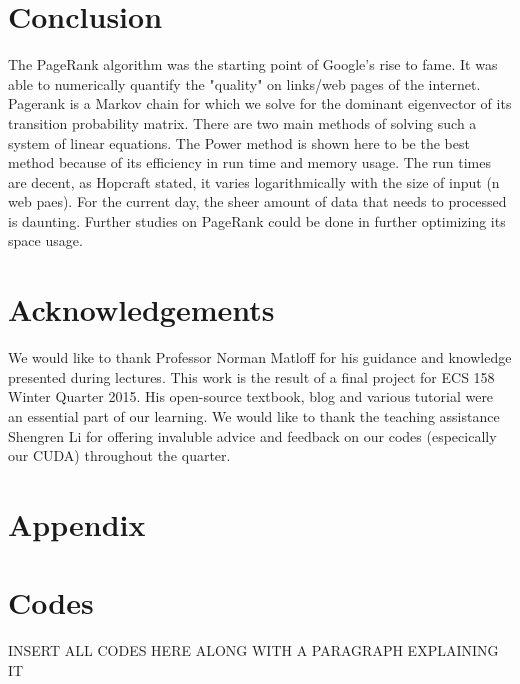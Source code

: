 \documentclass[11pt,letterpaper]{article}
\begin{document}
\section{Conclusion}

The PageRank algorithm was the starting point of Google's rise to fame. It was able to numerically quantify the "quality" on links/web pages of the internet. Pagerank is a Markov chain for which we solve for the dominant eigenvector of its transition probability matrix. There are two main methods of solving such a system of linear equations. The Power method is shown here to be the best method because of its efficiency in run time and memory usage. The run times are decent, as Hopcraft stated, it varies logarithmically with the size of input (n web paes). For the current day, the sheer amount of data that needs to processed is daunting. Further studies on PageRank could be done in further optimizing its space usage. 

\section{Acknowledgements}
We would like to thank Professor Norman Matloff for his guidance and knowledge presented during lectures. This work is the result of a final project for ECS 158 Winter Quarter 2015.  His open-source textbook, blog and various tutorial were an essential part of our learning. We would like to thank the teaching assistance Shengren Li for offering invaluble advice and feedback on our codes (especically our CUDA) throughout the quarter.

\section{Appendix}

\appendix
\section{Codes} \label{App:AppendixA}

INSERT ALL CODES HERE ALONG WITH A PARAGRAPH EXPLAINING IT
\end{document}
